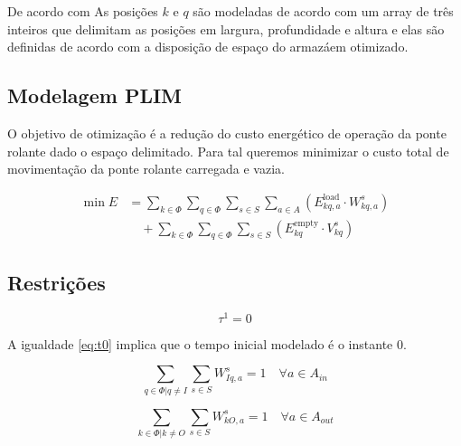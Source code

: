\documentclass[journal]{IEEEtran}
\begin{document}
        De acordo com \cite{YUAN2017424} As posições $k$ e $q$ são modeladas de 
        acordo com um array de três inteiros que delimitam as posições em largura,
        profundidade e altura e elas são definidas de acordo com a disposição de
        espaço do armazáem otimizado. 

        \subsection{Modelagem PLIM}

        O objetivo de otimização é a redução do custo energético de operação da 
        ponte rolante dado o espaço delimitado. Para tal queremos minimizar o 
        custo total de movimentação da ponte rolante carregada e vazia.

        \begin{align*}
            \min E &= \sum_{k \in \Phi} \sum_{q \in \Phi} \sum_{s \in S} \sum_{a \in A} 
                    \left( E_{kq,a}^{\text{load}} \cdot W_{kq,a}^s \right) \\
                &\quad + \sum_{k \in \Phi} \sum_{q \in \Phi} \sum_{s \in S} 
                    \left( E_{kq}^{\text{empty}} \cdot V_{kq}^s \right)
            \label{eq:objetivo}
        \end{align*}

        \subsection{Restrições}

        \begin{equation}
            \tau^{1} = 0
            \label{eq:t0}
        \end{equation}

        A igualdade \ref{eq:t0} implica que o tempo inicial modelado é o instante 0.

        \begin{equation}
            \sum_{q \in \Phi | q \neq I} \sum_{s \in S} W^s_{Iq,a} = 1 \quad \forall a \in A_{in} 
            \label{eq:in_movement_limit}
        \end{equation}

        \begin{equation}
            \sum_{k \in \Phi | k \neq O} \sum_{s \in S} W^s_{kO,a} = 1 \quad \forall a \in A_{out}
            \label{eq:out_movement_limit}
        \end{equation}
\end{document}
